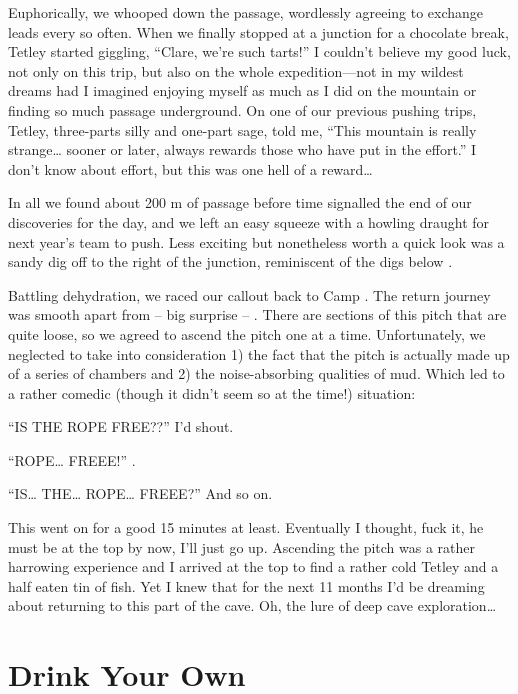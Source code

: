 Euphorically, we whooped down the passage, wordlessly agreeing to
exchange leads every so often. When we finally stopped at a junction for
a chocolate break, Tetley started giggling, ``Clare, we're such tarts!''
I couldn't believe my good luck, not only on this trip, but also on the
whole expedition---not in my wildest dreams had I imagined enjoying
myself as much as I did on the mountain or finding so much passage
underground. On one of our previous pushing trips, Tetley, three-parts
silly and one-part sage, told me, ``This mountain is really strange\ldots{} 
sooner or later,  always rewards those who have put in the effort.''
I don't know about effort, but this was one hell of a reward\ldots{}

In all we found about 200 m of passage before time signalled the end of
our discoveries for the day, and we left an easy squeeze with a howling
draught for next year's team to push. Less exciting but nonetheless
worth a quick look was a sandy dig off to the right of the junction,
reminiscent of the digs below .

Battling dehydration, we raced our callout back to Camp .
The return journey was smooth apart from -- big surprise -- . There are sections of this pitch that are quite loose, so we
agreed to ascend the pitch one at a time. Unfortunately, we neglected to
take into consideration 1) the fact that the pitch is actually made up
of a series of chambers and 2) the noise-absorbing qualities of mud.
Which led to a rather comedic (though it didn't seem so at the time!)
situation:

``IS THE ROPE FREE??'' I'd shout.

``ROPE\ldots{} FREEE!'' .

``IS\ldots{} THE\ldots{} ROPE\ldots{} FREEE?'' And so on.

This went on for a good 15 minutes at least. Eventually I thought, fuck
it, he must be at the top by now, I'll just go up. Ascending the pitch
was a rather harrowing experience and I arrived at the top to find a
rather cold Tetley and a half eaten tin of fish. Yet I knew that for the
next 11 months I'd be dreaming about returning to this part of the cave.
Oh, the lure of deep cave exploration\ldots{}




\section{Drink Your Own}

